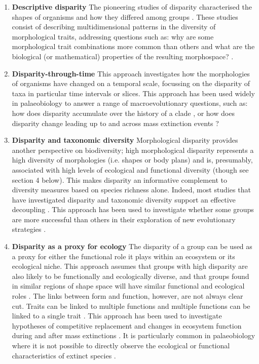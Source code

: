 \documentclass[12pt,letterpaper]{article}
\begin{document}
\begin{enumerate}

	\item \textbf{Descriptive disparity} The pioneering studies of disparity characterised the shapes of organisms and how they differed among groups \citep{Foote1995-do, Briggs1992-pd}.
	These studies consist of describing multidimensional patterns in the diversity of morphological traits, addressing questions such as: why are some morphological trait combinations more common than others and what are the biological (or mathematical) properties of the resulting morphospace? \citep{Foote1995-do, Raup1961-vx, Gerber2017-xi}.

	\item \textbf{Disparity-through-time} This approach investigates how the morphologies of organisms have changed on a temporal scale, focussing on the disparity of taxa in particular time intervals or slices.
	This approach has been used widely in palaeobiology to answer a range of macroevolutionary questions, such as: how does disparity accumulate over the history of a clade \citep{Guillerme2018-uj, Wright2017-jo}, or how does disparity change leading up to and across mass extinction events \citep{Friedman2010-ve}?

	\item \textbf{Disparity and taxonomic diversity} Morphological disparity provides another perspective on biodiversity; high morphological disparity represents a high diversity of morphologies (i.e. shapes or body plans) and is, presumably, associated with high levels of ecological and functional diversity (though see section 4 below).
	This makes disparity an informative complement to diversity measures based on species richness alone. Indeed, most studies that have investigated disparity and taxonomic diversity support an effective decoupling 
	\citep[][e.g.]{Fortey1996-kt, Moyne2007-jm, Ruta2013-iy, Hopkins2013-xt}.
	This approach has been used to investigate whether some groups are more successful than others in their exploration of new evolutionary strategies \citep{Losos2011-fq}.

	\item \textbf{Disparity as a proxy for ecology} The disparity of a group can be used as a proxy for either the functional role it plays within an ecosystem or its ecological niche.
	This approach assumes that groups with high disparity are also likely to be functionally and ecologically diverse, and that groups found in similar regions of shape space will have similar functional and ecological roles
	\citep{Friedman2010-ve, Pierce2008-yr, Anderson2013-zt}.
	The links between form and function, however, are not always clear cut.
	Traits can be linked to multiple functions and multiple functions can be linked to a single trait \citep{Wainwright2005-or}.
	This approach has been used to investigate hypotheses of competitive replacement \citep{Brusatte2008-vx} and changes in ecosystem function during and after mass extinctions \citep{Friedman2010-ve}.
	It is particularly common in palaeobiology where it is not possible to directly observe the ecological or functional characteristics of extinct species \citep{Wainwright2005-or}.


\end{enumerate}
\end{document}

